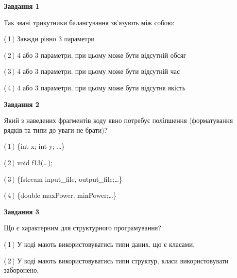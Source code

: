 \documentclass[10pt, ukrainian]{article}
\begin{document}
{
\begin {large}
{\begin {center}\textbf{Завдання 1}\end {center}}\par
Так звані трикутники балансування зв'язують між собою:\par
\vspace{2mm}



(\,1\,) Завжди рівно 3 параметри%



(\,2\,) 4 або 3 параметри, при цьому може бути відсутній обсяг %



(\,3\,) 4 або 3 параметри, при цьому може бути відсутній час%



(\,4\,) 4 або 3 параметри, при цьому може бути відсутня якість%


{\begin {center}\textbf{Завдання 2}\end {center}}\par
Який з наведених фрагментів коду явно потребує поліпшення (форматування рядків та типи до уваги не брати)?\par
\vspace{2mm}



(\,1\,) \{int x; int y; …\}%



(\,2\,) void f13(…);%



(\,3\,) \{fstream input\_file, output\_file;…\} %



(\,4\,) \{double maxPower, minPower;…\} %


{\begin {center}\textbf{Завдання 3}\end {center}}\par
Що є характерним для структурного програмування?\par
\vspace{2mm}



(\,1\,) У коді мають використовуватись типи даних, що є класами. %



(\,2\,) У коді мають використовуватись типи структур, класи використовувати заборонено. %




\end{large}}
\end{document}
